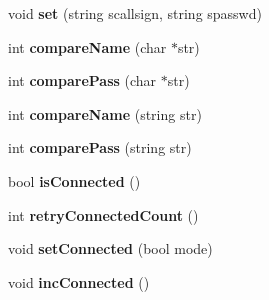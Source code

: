 \begin{DoxyCompactItemize}
\item 
void {\bfseries set} (string scallsign, string spasswd)\hypertarget{classAccount_a95a3ebcb5ded95f5c58804a082b51f1d}{}\label{classAccount_a95a3ebcb5ded95f5c58804a082b51f1d}

\item 
int {\bfseries compare\+Name} (char $\ast$str)\hypertarget{classAccount_ab9870c176b8c4c960f55b82ac55ecc3a}{}\label{classAccount_ab9870c176b8c4c960f55b82ac55ecc3a}

\item 
int {\bfseries compare\+Pass} (char $\ast$str)\hypertarget{classAccount_a83eaa1917e70158dd1994cbede67a090}{}\label{classAccount_a83eaa1917e70158dd1994cbede67a090}

\item 
int {\bfseries compare\+Name} (string str)\hypertarget{classAccount_a65cb1613fc76da6e28dd466d974afd6e}{}\label{classAccount_a65cb1613fc76da6e28dd466d974afd6e}

\item 
int {\bfseries compare\+Pass} (string str)\hypertarget{classAccount_a4cd679ea4b42d9aa6f8ff5a092b52201}{}\label{classAccount_a4cd679ea4b42d9aa6f8ff5a092b52201}

\item 
bool {\bfseries is\+Connected} ()\hypertarget{classAccount_ac0a8311d399d9a50a3e9953307dac913}{}\label{classAccount_ac0a8311d399d9a50a3e9953307dac913}

\item 
int {\bfseries retry\+Connected\+Count} ()\hypertarget{classAccount_aba8b0af89cb9c452d5895bf3b1597281}{}\label{classAccount_aba8b0af89cb9c452d5895bf3b1597281}

\item 
void {\bfseries set\+Connected} (bool mode)\hypertarget{classAccount_a2797301ff3be0d6cf0d9d30e08be57de}{}\label{classAccount_a2797301ff3be0d6cf0d9d30e08be57de}

\item 
void {\bfseries inc\+Connected} ()\hypertarget{classAccount_a2e23c5821710c8b6007d38ee056c75f5}{}\label{classAccount_a2e23c5821710c8b6007d38ee056c75f5}

\end{DoxyCompactItemize}
